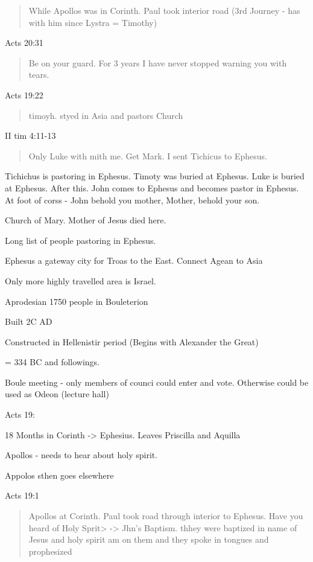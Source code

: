\documentclass[
]{book}
\begin{document}
\begin{quote}
While Apollos was in Corinth. Paul took interior road (3rd Journey - has with him since Lystra = Timothy)
\end{quote}

Acts 20:31

\begin{quote}
Be on your guard. For 3 years I have never stopped warning you with tears.
\end{quote}

Acts 19:22

\begin{quote}
timoyh. styed in Asia and pastors Church
\end{quote}

II tim 4:11-13

\begin{quote}
Only Luke with mith me. Get Mark. I sent Tichicus to Ephesus.
\end{quote}

Tichichus is pastoring in Ephesus. Timoty was buried at Ephesus. Luke is buried at Ephesus. After this. John comes to Ephesus and becomes pastor in Ephesus. At foot of corss - John behold you mother, Mother, behold your son.

Church of Mary. Mother of Jesus died here.

Long list of people pastoring in Ephesus.

Ephesus a gateway city for Troas to the East. Connect Agean to Asia

Only more highly travelled area is Israel.

Aprodesian 1750 people in Bouleterion

Built 2C AD

Constructed in Hellenistir period (Begins with Alexander the Great)

= 334 BC and followings.

Boule meeting - only members of counci could enter and vote. Otherwise could be used as Odeon (lecture hall)

Acts 19:

18 Months in Corinth -\textgreater{} Ephesius. Leaves Priscilla and Aquilla

Apollos - needs to hear about holy spirit.

Appolos sthen goes elsewhere

Acts 19:1

\begin{quote}
Apollos at Corinth. Paul took road through interior to Ephesus. Have you heard of Holy Sprit\textgreater{} -\textgreater{} Jhn's Baptism. thhey were baptized in name of Jesus and holy spirit am on them and they spoke in tongues and prophesized
\end{quote}
\end{document}
